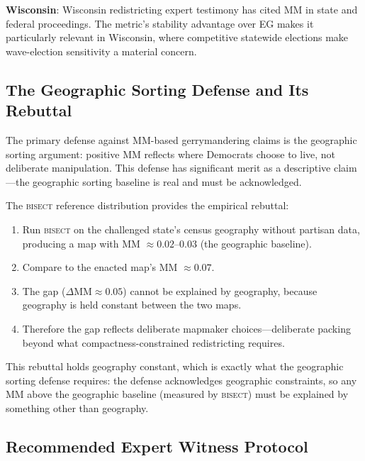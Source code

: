 \textbf{Wisconsin}: Wisconsin redistricting expert testimony has cited MM in state
and federal proceedings. The metric's stability advantage over EG makes it
particularly relevant in Wisconsin, where competitive statewide elections make
wave-election sensitivity a material concern.

\subsection{The Geographic Sorting Defense and Its Rebuttal}

The primary defense against MM-based gerrymandering claims is the geographic
sorting argument: positive MM reflects where Democrats choose to live, not
deliberate manipulation. This defense has significant merit as a descriptive
claim---the geographic sorting baseline is real and must be acknowledged.

The \textsc{bisect} reference distribution provides the empirical rebuttal:
\begin{enumerate}
\item Run \textsc{bisect} on the challenged state's census geography without
  partisan data, producing a map with MM $\approx 0.02$--$0.03$ (the geographic baseline).
\item Compare to the enacted map's MM $\approx 0.07$.
\item The gap ($\Delta\text{MM} \approx 0.05$) cannot be explained by geography,
  because geography is held constant between the two maps.
\item Therefore the gap reflects deliberate mapmaker choices---deliberate packing
  beyond what compactness-constrained redistricting requires.
\end{enumerate}

This rebuttal holds geography constant, which is exactly what the geographic sorting
defense requires: the defense acknowledges geographic constraints, so any MM above
the geographic baseline (measured by \textsc{bisect}) must be explained by something
other than geography.

\subsection{Recommended Expert Witness Protocol}

